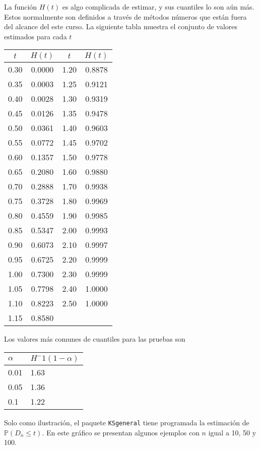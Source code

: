 \documentclass[
  12pt,
]{book}
\begin{document}
La función \(H(t)\) es algo complicada de estimar, y sus cuantiles lo son aún
más. Estos normalmente son definidos a través de métodos números que están fuera
del alcance del este curso. La siguiente tabla muestra el conjunto de valores
estimados para cada \(t\)

\begin{tabular}{|cc|cc|}
\hline $t$ & $H(t)$ & $t$ & $H(t)$ \\
\hline 0.30 & 0.0000 & 1.20 & 0.8878 \\
0.35 & 0.0003 & 1.25 & 0.9121 \\
0.40 & 0.0028 & 1.30 & 0.9319 \\
0.45 & 0.0126 & 1.35 & 0.9478 \\
0.50 & 0.0361 & 1.40 & 0.9603 \\
0.55 & 0.0772 & 1.45 & 0.9702 \\
0.60 & 0.1357 & 1.50 & 0.9778 \\
0.65 & 0.2080 & 1.60 & 0.9880 \\
0.70 & 0.2888 & 1.70 & 0.9938 \\
0.75 & 0.3728 & 1.80 & 0.9969 \\
0.80 & 0.4559 & 1.90 & 0.9985 \\
0.85 & 0.5347 & 2.00 & 0.9993 \\
0.90 & 0.6073 & 2.10 & 0.9997 \\
0.95 & 0.6725 & 2.20 & 0.9999 \\
1.00 & 0.7300 & 2.30 & 0.9999 \\
1.05 & 0.7798 & 2.40 & 1.0000 \\
1.10 & 0.8223 & 2.50 & 1.0000 \\
1.15 & 0.8580 & & \\
\hline
\end{tabular}

Los valores más comunes de cuantiles para las pruebas son

\begin{longtable}[]{@{}ll@{}}
\toprule
\(\alpha\) & \(H^-1(1-\alpha)\)\tabularnewline
\midrule
\endhead
0.01 & 1.63\tabularnewline
0.05 & 1.36\tabularnewline
0.1 & 1.22\tabularnewline
\bottomrule
\end{longtable}

Solo como ilustración, el paquete \texttt{KSgeneral} tiene programada la estimación de
\(\mathbb P (D_n \leq t)\). En este gráfico se presentan algunos ejemplos con
\(n\) igual a 10, 50 y 100.
\end{document}
